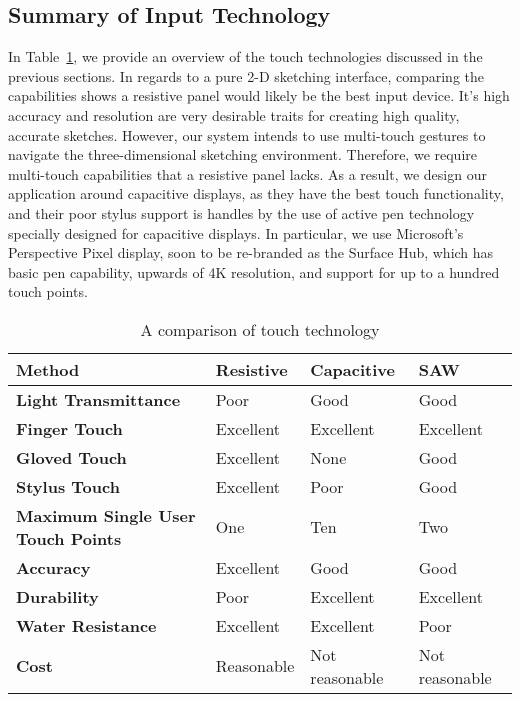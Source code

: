 \subsection{Summary of Input Technology}

In Table~\ref{tab:touchtech}, we provide an overview of the touch technologies discussed in the previous sections.
In regards to a pure 2-D sketching interface, comparing the capabilities shows a resistive panel would likely be the best input device.
It's high accuracy and resolution are very desirable traits for creating high quality, accurate sketches.
However, our system intends to use multi-touch gestures to navigate the three-dimensional sketching environment.
Therefore, we require multi-touch capabilities that a resistive panel lacks.
As a result, we design our application around capacitive displays, as they have the best touch functionality, and their poor stylus support is handles by the use of active pen technology specially designed for capacitive displays.
In particular, we use Microsoft's Perspective Pixel display, soon to be re-branded as the Surface Hub, which has basic pen capability, upwards of 4K resolution, and support for up to a hundred touch points.

\begin{table}
\label{tab:touchtech}
\begin{center}
\begin{tabular}{| p{5cm} | l | p{3cm} | l |}
\hline
\textbf{Method} & \textbf{Resistive} & \textbf{Capacitive} & \textbf{SAW} \\ \hline
\textbf{Light Transmittance} & Poor & Good & Good \\ \hline
\textbf{Finger Touch} & Excellent & Excellent & Excellent \\ \hline
\textbf{Gloved Touch} & Excellent & None & Good \\ \hline
\textbf{Stylus Touch} & Excellent & Poor & Good \\ \hline
\textbf{Maximum Single User Touch Points} & One & Ten & Two \\ \hline
\textbf{Accuracy} & Excellent & Good & Good \\ \hline
\textbf{Durability} & Poor & Excellent & Excellent \\ \hline
\textbf{Water Resistance} & Excellent & Excellent & Poor \\ \hline
\textbf{Cost} & Reasonable & Not reasonable & Not reasonable \\ \hline
\end{tabular}
\end{center}
\caption{A comparison of touch technology}
\end{table}

